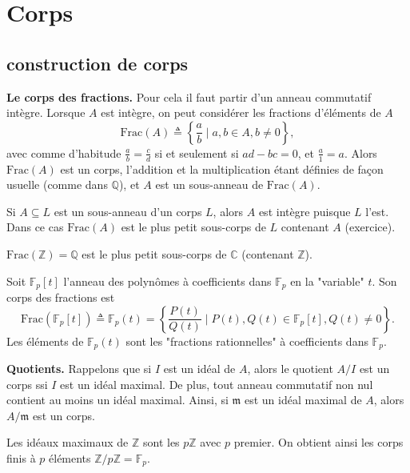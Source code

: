\chapter{Corps}

\section{construction de corps}

\textbf{Le corps des fractions.} Pour cela il faut partir d'un anneau commutatif intègre. Lorsque $A$ est intègre, on peut considérer les fractions d'éléments de $A$
$$\text{Frac}(A) \triangleq \left\{\frac{a}{b} \mid a, b \in A, b \neq 0\right\},$$
avec comme d'habitude $\frac{a}{b} = \frac{c}{d}$ si et seulement si $ad - bc = 0$, et $\frac{a}{1} = a$. Alors $\text{Frac}(A)$ est un corps, l'addition et la multiplication étant définies de façon usuelle (comme dans $\mathbb{Q}$), et $A$ est un sous-anneau de $\text{Frac}(A)$.

Si $A \subseteq L$ est un sous-anneau d'un corps $L$, alors $A$ est intègre puisque $L$ l'est. Dans ce cas $\text{Frac}(A)$ est le plus petit sous-corps de $L$ contenant $A$ (exercice).

\begin{exemple}
$\text{Frac}(\mathbb{Z}) = \mathbb{Q}$ est le plus petit sous-corps de $\mathbb{C}$ (contenant $\mathbb{Z}$).
\end{exemple}

\begin{exemple}
Soit $\mathbb{F}_p[t]$ l'anneau des polynômes à coefficients dans $\mathbb{F}_p$ en la "variable" $t$. Son corps des fractions est
$$\text{Frac}(\mathbb{F}_p[t]) \triangleq \mathbb{F}_p(t) = \left\{\frac{P(t)}{Q(t)} \mid P(t), Q(t) \in \mathbb{F}_p[t], Q(t) \neq 0\right\}.$$
Les éléments de $\mathbb{F}_p(t)$ sont les "fractions rationnelles" à coefficients dans $\mathbb{F}_p$.
\end{exemple}

\textbf{Quotients.} Rappelons que si $I$ est un idéal de $A$, alors le quotient $A/I$ est un corps ssi $I$ est un idéal maximal. De plus, tout anneau commutatif non nul contient au moins un idéal maximal. Ainsi, si $\mathfrak{m}$ est un idéal maximal de $A$, alors $A/\mathfrak{m}$ est un corps.

\begin{exemple}
Les idéaux maximaux de $\mathbb{Z}$ sont les $p\mathbb{Z}$ avec $p$ premier. On obtient ainsi les corps finis à $p$ éléments $\mathbb{Z}/p\mathbb{Z} = \mathbb{F}_p$.
\end{exemple}

